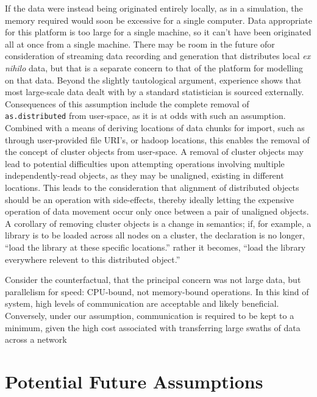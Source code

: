 \documentclass[10pt, a4paper]{article}
\begin{document}
If the data were instead being originated entirely locally, as in a simulation,
the memory required would soon be excessive for a single computer.
Data appropriate for this platform is too large for a single machine, so it
can't have been originated all at once from a single machine.
There may be room in the future ofor consideration of streaming data recording
and generation that distributes local \textit{ex nihilo} data, but that is a
separate concern to that of the platform for modelling on that data.
Beyond the slightly tautological argument, experience shows that most
large-scale data dealt with by a standard statistician is sourced externally.
Consequences of this assumption include the complete removal of
\texttt{as.distributed} from user-space, as it is at odds with such an
assumption.
Combined with a means of deriving locations of data chunks for import, such as
through user-provided file URI's, or hadoop locations, this enables the removal
of the concept of cluster objects from user-space.
A removal of cluster objects may lead to potential difficulties upon attempting
operations involving multiple independently-read objects, as they may be
unaligned, existing in different locations.
This leads to the consideration that alignment of distributed objects should be
an operation with side-effects, thereby ideally letting the expensive operation
of data movement occur only once between a pair of unaligned objects.
A corollary of removing cluster objects is a change in semantics; if, for
example, a library is to be loaded across all nodes on a cluster, the
declaration is no longer, ``load the library at these specific locations.''
rather it becomes, ``load the library everywhere relevent to this distributed
object.''

Consider the counterfactual, that the principal concern was not large data, but
parallelism for speed: CPU-bound, not memory-bound operations.
In this kind of system, high levels of communication are acceptable and likely
beneficial.
Conversely, under our assumption, communication is required to be kept to a
minimum, given the high cost associated with transferring large swaths of data
across a network

\section{Potential Future Assumptions}\label{sec:potential}
\end{document}
